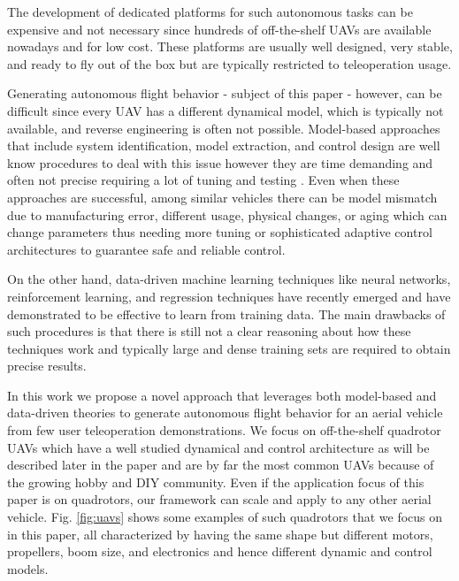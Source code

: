 \documentclass[letterpaper, 10 pt, conference]{ieeeconf}  %
\begin{document}
The development of dedicated platforms for such autonomous tasks can be expensive and not necessary since hundreds of off-the-shelf UAVs are available nowadays and for low cost. These platforms are usually well designed, very stable, and ready to fly out of the box but are typically restricted to teleoperation usage.

Generating autonomous flight behavior - subject of this paper -  however, can be difficult since every UAV has a different dynamical model, which is typically not available, and reverse engineering is often not possible. Model-based approaches that include system identification, model extraction, and control design are well know procedures to deal with this issue however they are time demanding and often not precise requiring a lot of tuning and testing \cite{modelbased1}. Even when these approaches are successful, among similar vehicles there can be model mismatch due to manufacturing error, different usage, physical changes, or aging which can change parameters thus needing more tuning or sophisticated adaptive control architectures to guarantee safe and reliable control. 

On the other hand, data-driven machine learning techniques like neural networks, reinforcement learning, and regression techniques have recently emerged and have demonstrated to be effective to learn from training data. The main drawbacks of such procedures is that there is still not a clear reasoning about how these techniques work and typically large and dense training sets are required to obtain precise results.

In this work we propose a novel approach that leverages both model-based and data-driven theories to generate autonomous flight behavior for an aerial vehicle from few user teleoperation demonstrations. 
We focus on off-the-shelf quadrotor UAVs which have a well studied dynamical and control architecture as will be described later in the paper and are by far the most common UAVs because of the growing hobby and DIY community. Even if the application  focus of this paper is on quadrotors, our framework can scale and apply to any other aerial vehicle. Fig. \ref{fig:uavs} shows some examples of such quadrotors that we focus on in this paper, all characterized by having the same shape but different motors, propellers, boom size, and electronics and hence different dynamic and control models.
\end{document}
